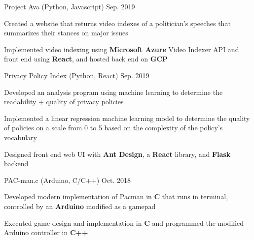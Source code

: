 

\begin{cventries}

  \cventry
    {Project Ava (Python, Javascript)} %
    {}
    {}
    {Sep. 2019} %
    {
      \begin{cvitems} %
        \item {Created a website that returns video indexes of a politician's speeches that summarizes their stances on major issues}
        \item {Implemented video indexing using \textbf{Microsoft Azure} Video Indexer API and front end using \textbf{React}, and hosted back end on \textbf{GCP}}
      \end{cvitems}
    }

  \cventry
    {Privacy Policy Index (Python, React)} %
    {}
    {}
    {Sep. 2019} %
    {
      \begin{cvitems} %
        \item {Developed an analysis program using machine learning to determine the readability + quality of privacy policies}
        \item {Implemented a linear regression machine learning model to determine the quality of policies on a scale from 0 to 5 based on the complexity of the policy's vocabulary}
        \item {Designed front end web UI with \textbf{Ant Design}, a \textbf{React} library, and \textbf{Flask} backend}
      \end{cvitems}
    }

  \cventry
  {PAC-man.c (Arduino, C/C++)} %
  {} %
  {}
  {Oct. 2018}
  {
    \begin{cvitems} %
      \item {Developed modern implementation of Pacman in \textbf{C} that runs in terminal, controlled by an \textbf{Arduino} modified as a gamepad}
      \item {Executed game design and implementation in \textbf{C} and programmed the modified Arduino controller in \textbf{C++}}
    \end{cvitems}
  }


\end{cventries}
